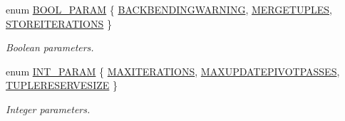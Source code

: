 \begin{DoxyCompactItemize}
enum \hyperlink{class_s_g_solver_a8de18768065063c3641acbb1b3fcd844}{B\+O\+O\+L\+\_\+\+P\+A\+R\+A\+M} \{ \hyperlink{class_s_g_solver_a8de18768065063c3641acbb1b3fcd844a3dd1bfe7d9d0268d8d9807c8580745f3}{B\+A\+C\+K\+B\+E\+N\+D\+I\+N\+G\+W\+A\+R\+N\+I\+N\+G}, 
\hyperlink{class_s_g_solver_a8de18768065063c3641acbb1b3fcd844aafed85a93502e88e9d0edb743e859c75}{M\+E\+R\+G\+E\+T\+U\+P\+L\+E\+S}, 
\hyperlink{class_s_g_solver_a8de18768065063c3641acbb1b3fcd844a447d2987020b6414a437e635cc056f76}{S\+T\+O\+R\+E\+I\+T\+E\+R\+A\+T\+I\+O\+N\+S}
 \}
\begin{DoxyCompactList}\small\item\em Boolean parameters. \end{DoxyCompactList}\item 
enum \hyperlink{class_s_g_solver_a75381212963ce8fdcedd23bcff09d1fb}{I\+N\+T\+\_\+\+P\+A\+R\+A\+M} \{ \hyperlink{class_s_g_solver_a75381212963ce8fdcedd23bcff09d1fba36675905026ea36c017401b6cfb154a5}{M\+A\+X\+I\+T\+E\+R\+A\+T\+I\+O\+N\+S}, 
\hyperlink{class_s_g_solver_a75381212963ce8fdcedd23bcff09d1fbab504488bb8ba8787ddac497136fb4035}{M\+A\+X\+U\+P\+D\+A\+T\+E\+P\+I\+V\+O\+T\+P\+A\+S\+S\+E\+S}, 
\hyperlink{class_s_g_solver_a75381212963ce8fdcedd23bcff09d1fbab2ddd945c81d3890926ae3d46f5cf8a7}{T\+U\+P\+L\+E\+R\+E\+S\+E\+R\+V\+E\+S\+I\+Z\+E}
 \}
\begin{DoxyCompactList}\small\item\em Integer parameters. \end{DoxyCompactList}\end{DoxyCompactItemize}
